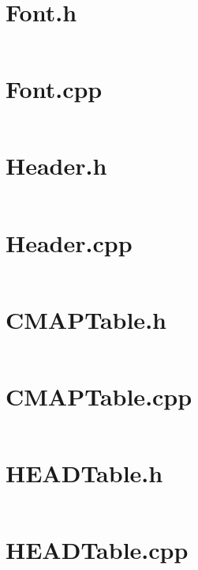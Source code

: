 \documentclass{report}
\begin{document}
\section{Font.h}
\inputminted[linenos, frame=lines, framesep=2mm, breaklines, tabsize=4]{cpp}{/home/jake/TTFParser/include/Font.h}
\section{Font.cpp}
\inputminted[linenos, frame=lines, framesep=2mm, breaklines,
tabsize=4]{cpp}{/home/jake/TTFParser/src/Font.cpp}

\section{Header.h}
\inputminted[linenos, frame=lines, framesep=2mm, breaklines,
tabsize=4]{cpp}{/home/jake/TTFParser/include/Header.h}

\section{Header.cpp}
\inputminted[linenos, frame=lines, framesep=2mm, breaklines,
tabsize=4]{cpp}{/home/jake/TTFParser/src/Header.cpp}

\section{CMAPTable.h}
\inputminted[linenos, frame=lines, framesep=2mm, breaklines,
tabsize=4]{cpp}{/home/jake/TTFParser/include/CMAPTable.h}

\section{CMAPTable.cpp}
\inputminted[linenos, frame=lines, framesep=2mm, breaklines,
tabsize=4]{cpp}{/home/jake/TTFParser/src/CMAPTable.cpp}

\section{HEADTable.h}
\inputminted[linenos, frame=lines, framesep=2mm, breaklines,
tabsize=4]{cpp}{/home/jake/TTFParser/include/HEADTable.h}

\section{HEADTable.cpp}
\inputminted[linenos, frame=lines, framesep=2mm, breaklines,
tabsize=4]{cpp}{/home/jake/TTFParser/src/HEADTable.cpp}
\end{document}
